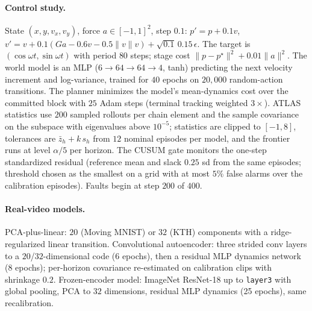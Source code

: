 \paragraph{Control study.} State $(x,y,v_x,v_y)$, force $a\in[-1,1]^2$, step $0.1$: $p'=p+0.1v$, $v'=v+0.1(Ga-0.6v-0.5\|v\|v)+\sqrt{0.1}\,0.15\,\epsilon$. The target is $(\cos\omega t,\sin\omega t)$ with period $80$ steps; stage cost $\|p-p^\star\|^2+0.01\|a\|^2$. The world model is an MLP ($6\to64\to64\to4$, tanh) predicting the next velocity increment and log-variance, trained for $40$ epochs on $20{,}000$ random-action transitions. The planner minimizes the model's mean-dynamics cost over the committed block with $25$ Adam steps (terminal tracking weighted $3\times$). ATLAS statistics use $200$ sampled rollouts per chain element and the sample covariance on the subspace with eigenvalues above $10^{-5}$; statistics are clipped to $[-1,8]$, tolerances are $\bar z_h+k\,s_h$ from $12$ nominal episodes per model, and the frontier runs at level $\alpha/5$ per horizon. The CUSUM gate monitors the one-step standardized residual (reference mean and slack $0.25$ sd from the same episodes; threshold chosen as the smallest on a grid with at most $5\%$ false alarms over the calibration episodes). Faults begin at step $200$ of $400$.

\paragraph{Real-video models.} PCA-plus-linear: $20$ (Moving MNIST) or $32$ (KTH) components with a ridge-regularized linear transition. Convolutional autoencoder: three strided conv layers to a $20$/$32$-dimensional code (6 epochs), then a residual MLP dynamics network (8 epochs); per-horizon covariance re-estimated on calibration clips with shrinkage $0.2$. Frozen-encoder model: ImageNet ResNet-18 up to \texttt{layer3} with global pooling, PCA to $32$ dimensions, residual MLP dynamics (25 epochs), same recalibration.
